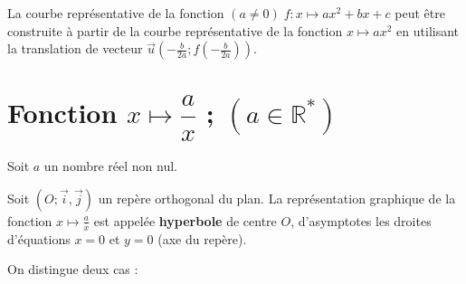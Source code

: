 






\begin{Remarque}[][]
La courbe représentative de la fonction $(a \neq 0) \; f : x \mapsto ax^2 + bx + c$ peut être construite à partir de la courbe représentative de la fonction $x \mapsto ax^2$ en utilisant la translation de vecteur $\vec{u} \left( -\frac{b}{2a} ; f\left(-\frac{b}{2a}\right) \right)$.
\end{Remarque}


\section{Fonction $x \mapsto \dfrac{a}{x}$ ; $(a \in \mathbb{R}^*)$ }





\begin{Definition}[][]
Soit $a$ un nombre réel non nul.

Soit $(O; \vec{i}, \vec{j})$ un repère orthogonal du plan.
La représentation graphique de la fonction $x \mapsto \frac{a}{x}$ est appelée \textbf{hyperbole} de centre $O$, d'asymptotes les droites d'équations $x = 0$ et $y = 0$ (axe du repère).
\end{Definition}

\noindent On distingue deux cas :

\vspace{0.2cm}

